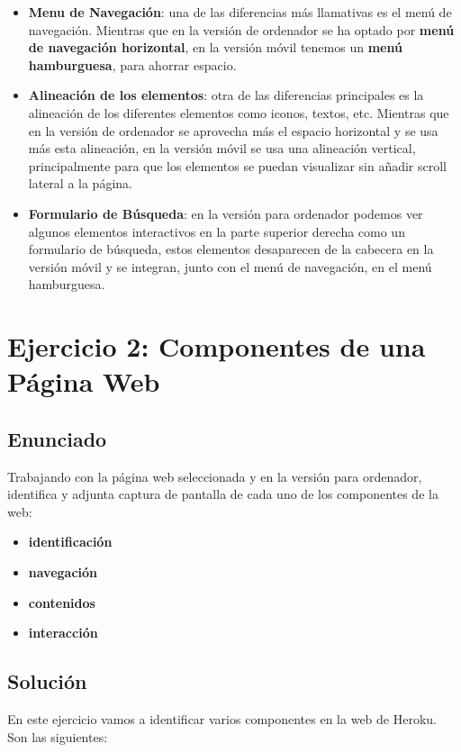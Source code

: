 \begin{itemize}
    \item \textbf{Menu de Navegación}: una de las diferencias más llamativas es el menú de navegación. Mientras que en la versión de ordenador se ha optado por \textbf{menú de navegación horizontal}, en la versión móvil tenemos un \textbf{menú hamburguesa}, para ahorrar espacio.

    \item \textbf{Alineación de los elementos}: otra de las diferencias principales es la alineación de los diferentes elementos como iconos, textos, etc. Mientras que en la versión de ordenador se aprovecha más el espacio horizontal y se usa más esta alineación, en la versión móvil se usa una alineación vertical, principalmente para que los elementos se puedan visualizar sin añadir scroll lateral a la página.

    \item \textbf{Formulario de Búsqueda}: en la versión para ordenador podemos ver algunos elementos interactivos en la parte superior derecha como un formulario de búsqueda, estos elementos desaparecen de la cabecera en la versión móvil y se integran, junto con el menú de navegación, en el menú hamburguesa.
\end{itemize}

\section{Ejercicio 2: Componentes de una Página Web}
\subsection{Enunciado}
Trabajando con la página web seleccionada y en la versión para ordenador, identifica y adjunta captura de pantalla de cada uno  de los componentes de la web:
\begin{itemize}
    \item \textbf{identificación}
    \item \textbf{navegación}
    \item \textbf{contenidos}
    \item \textbf{interacción}
\end{itemize}

\subsection{Solución}
En este ejercicio vamos a identificar varios componentes en la web de Heroku. Son las siguientes:

